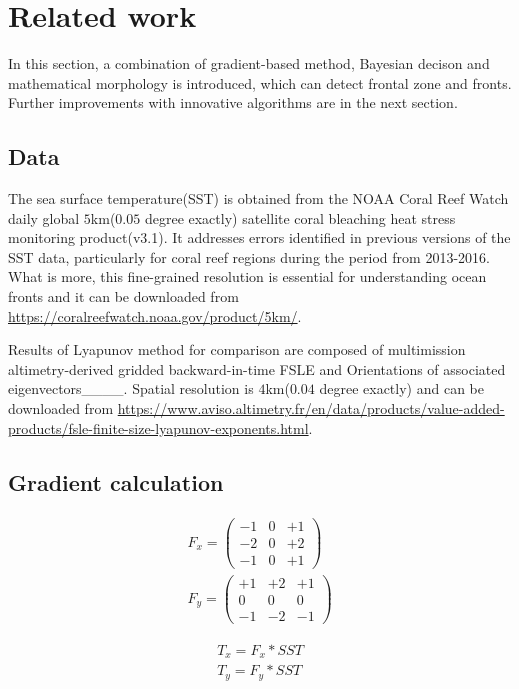 \section{Related work}
In this section, a combination of gradient-based method, Bayesian decison and mathematical morphology is introduced, which can detect frontal zone and fronts. Further improvements with innovative algorithms are in the next section.

\subsection{Data}
The sea surface temperature(SST) is obtained from the NOAA Coral Reef Watch daily global $5$km($0.05$ degree exactly) satellite coral bleaching heat stress monitoring product(v3.1). It addresses errors identified in previous versions of the SST data, particularly for coral reef regions during the period from 2013-2016. What is more, this fine-grained resolution is essential for understanding ocean fronts and it can be downloaded from \url{https://coralreefwatch.noaa.gov/product/5km/}. 

Results of Lyapunov method for comparison are composed of multimission altimetry-derived gridded backward-in-time FSLE and Orientations of associated eigenvectors____. Spatial resolution is $4$km($0.04$ degree exactly) and can be downloaded from \url{https://www.aviso.altimetry.fr/en/data/products/value-added-products/fsle-finite-size-lyapunov-exponents.html}.

\subsection{Gradient calculation}
\begin{equation}\label{eq:kernel}
	\begin{gathered}
		F_{x}=\begin{pmatrix}-1&0&+1\\-2&0&+2\\-1&0&+1\end{pmatrix}\\
		F_{y}=\begin{pmatrix}+1&+2&+1\\0&0&0\\-1&-2&-1\end{pmatrix}
	\end{gathered}
\end{equation}

\begin{equation}
	\begin{gathered}
		T_x=F_x*SST\\
		T_y=F_y*SST
	\end{gathered}
\end{equation}

